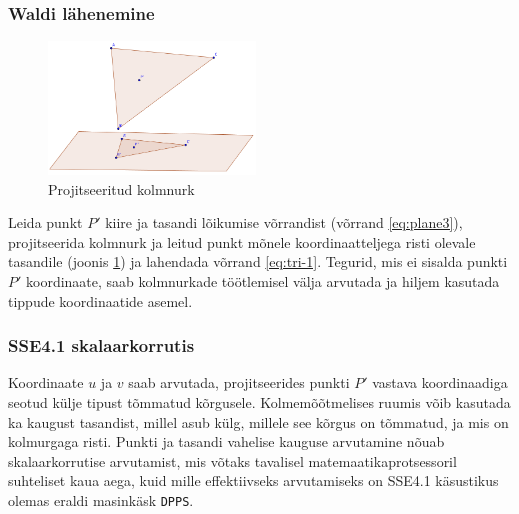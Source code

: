 \documentclass[a4paper,12pt]{report}
\begin{document}
\subsubsection{Waldi lähenemine}
\begin{figure}
\includegraphics[width=0.49\textwidth]{tri-wald}
\caption{Projitseeritud kolmnurk}
\label{fig:tri-wald}
\end{figure}
Leida punkt \(P'\) kiire ja tasandi lõikumise võrrandist (võrrand
\ref{eq:plane3}), projitseerida kolmnurk ja leitud punkt mõnele koordinaatteljega
risti olevale tasandile (joonis \ref{fig:tri-wald}) ja lahendada võrrand \ref{eq:tri-1}. Tegurid, mis
ei sisalda punkti \(P'\) koordinaate, saab kolmnurkade töötlemisel välja
arvutada ja hiljem kasutada tippude koordinaatide asemel.
\cite[lk. 91]{wald::PhD}

\subsubsection{SSE4.1 skalaarkorrutis}
Koordinaate \(u\) ja \(v\) saab arvutada, projitseerides punkti \(P'\)
vastava koordinaadiga seotud külje tipust tõmmatud kõrgusele. Kolmemõõtmelises
ruumis võib kasutada ka kaugust tasandist, millel asub külg, millele see
kõrgus on tõmmatud, ja mis on kolmurgaga risti. Punkti ja tasandi vahelise
kauguse arvutamine nõuab skalaarkorrutise arvutamist, mis võtaks tavalisel
matemaatikaprotsessoril suhteliset kaua aega, kuid mille effektiivseks 
arvutamiseks on SSE4.1 käsustikus olemas eraldi masinkäsk \texttt{DPPS}.
\cite{TriSSE4}
\end{document}
